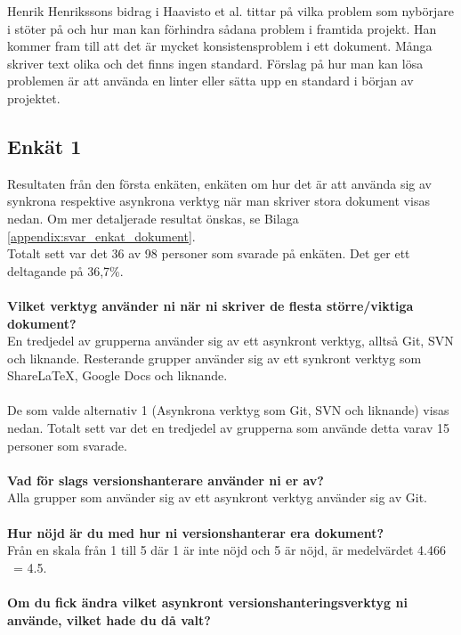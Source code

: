 
Henrik Henrikssons bidrag i Haavisto et al. \cite{Haavisto954095} tittar på vilka problem som nybörjare i \latex stöter på och hur man kan förhindra sådana problem i framtida projekt. Han kommer fram till att det är mycket konsistensproblem i ett \latex dokument. Många skriver text olika och det finns ingen standard. Förslag på hur man kan lösa problemen är att använda en linter eller sätta upp en standard i början av projektet.

\subsection{Enkät 1}
Resultaten från den första enkäten, enkäten om hur det är att använda sig av synkrona respektive asynkrona verktyg när man skriver stora dokument visas nedan. Om mer detaljerade resultat önskas, se Bilaga \ref{appendix:svar_enkat_dokument}.\\
Totalt sett var det 36 av 98 personer som svarade på enkäten. Det ger ett deltagande på 36,7\%.\\
\\\textbf{Vilket verktyg använder ni när ni skriver de flesta större/viktiga dokument?}\\
En tredjedel av grupperna använder sig av ett asynkront verktyg, alltså Git, SVN och liknande. Resterande grupper använder sig av ett synkront verktyg som ShareLaTeX, Google Docs och liknande.\\\\
De som valde alternativ 1 (Asynkrona verktyg som Git, SVN och liknande) visas nedan. Totalt sett var det en tredjedel av grupperna som använde detta varav 15 personer som svarade.\\\\
\textbf{Vad för slags versionshanterare använder ni er av?}\\
Alla grupper som använder sig av ett asynkront verktyg använder sig av Git.\\\\
\textbf{Hur nöjd är du med hur ni versionshanterar era dokument?}\\
Från en skala från 1 till 5 där 1 är inte nöjd och 5 är nöjd, är medelvärdet 4.466 ~= 4.5.\\\\
\textbf{Om du fick ändra vilket asynkront versionshanteringsverktyg ni använde, vilket hade du då valt?}\\
